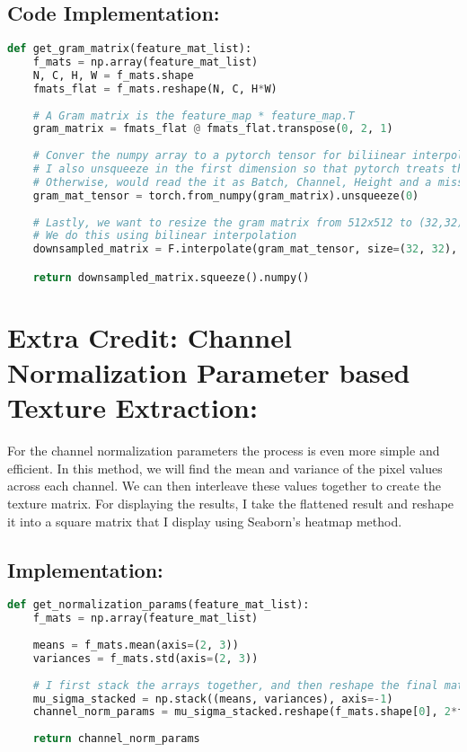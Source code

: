 \documentclass{article}
\begin{document}
\subsection{Code Implementation:}
\begin{lstlisting}[language=Python]
def get_gram_matrix(feature_mat_list):
    f_mats = np.array(feature_mat_list)
    N, C, H, W = f_mats.shape
    fmats_flat = f_mats.reshape(N, C, H*W)
    
    # A Gram matrix is the feature_map * feature_map.T
    gram_matrix = fmats_flat @ fmats_flat.transpose(0, 2, 1)
    
    # Conver the numpy array to a pytorch tensor for biliinear interpolation in downsampling
    # I also unsqueeze in the first dimension so that pytorch treats the final two dimensions as H,W and downsamples on those
    # Otherwise, would read the it as Batch, Channel, Height and a missing width
    gram_mat_tensor = torch.from_numpy(gram_matrix).unsqueeze(0)
    
    # Lastly, we want to resize the gram matrix from 512x512 to (32,32) for easier computation
    # We do this using bilinear interpolation
    downsampled_matrix = F.interpolate(gram_mat_tensor, size=(32, 32), mode='bilinear', align_corners=False)

    return downsampled_matrix.squeeze().numpy()
\end{lstlisting}

\section{\textbf{Extra Credit:} Channel Normalization Parameter based Texture Extraction:}
For the channel normalization parameters the process is even more simple and efficient. In this method, we will find the mean and variance of the pixel values across each channel. We can then interleave these values together to create the texture matrix. For displaying the results, I take the flattened result and reshape it into a square matrix that I display using Seaborn's heatmap method.

\subsection{Implementation: }
\begin{lstlisting}[language=Python]
def get_normalization_params(feature_mat_list):
    f_mats = np.array(feature_mat_list)
    
    means = f_mats.mean(axis=(2, 3))
    variances = f_mats.std(axis=(2, 3))
    
    # I first stack the arrays together, and then reshape the final matrix to interleave the means and variances
    mu_sigma_stacked = np.stack((means, variances), axis=-1)
    channel_norm_params = mu_sigma_stacked.reshape(f_mats.shape[0], 2*f_mats.shape[1])
    
    return channel_norm_params
\end{lstlisting}
\end{document}
